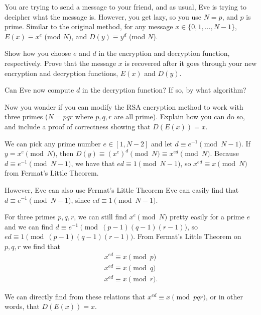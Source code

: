 \documentclass[11pt]{article}
\begin{document}
\newpage
{}
You are trying to send a message to your friend, and as usual, Eve is trying to decipher what the message is.
  However, you get lazy, so you use $N = p$, and $p$ is prime.
  Similar to the original method, for any message $x \in \{0,1, \ldots, N-1\}$, $E(x) \equiv x^e$ (mod $N$), and $D(y) \equiv y^d$ (mod $N$).
\begin{Parts}
  \Part
  Show how you choose $e$ and $d$ in the encryption and decryption function, respectively. Prove that the message $x$ is recovered after it goes through your new encryption and decryption functions, $E(x)$ and $D(y)$.

    \Part
    Can Eve now compute $d$ in the decryption function? If so, by what algorithm?

    \Part Now you wonder if you can modify the RSA encryption method to work with three primes ($N = pqr$ where $p, q, r$ are all prime). Explain how you can do so, and include a proof of correctness showing that $D(E(x)) = x$.

\end{Parts}

\begin{solution}
    \begin{Parts}
        \Part
        We can pick any prime number $e \in [1, N-2]$ and let $d \equiv e^{-1} \pmod{N-1}$. If $y = x^e \pmod N$, then $D(y) \equiv (x^e)^d \pmod N \equiv x^{ed} \pmod N$. Because $d \equiv e^{-1} \pmod{N-1}$, we have that $ed \equiv 1 \pmod{N-1}$, so $x^{ed} \equiv x \pmod N$ from Fermat's Little Theorem.
        
        \Part 
        However, Eve can also use Fermat's Little Theorem Eve can easily find that $d \equiv e^{-1} \pmod{N-1}$, since $ed \equiv 1 \pmod{N-1}$.
        
        \Part
        For three primes $p, q, r$, we can still find $x^e \pmod N$ pretty easily for a prime $e$ and we can find $d \equiv e^{-1} \pmod{(p-1)(q-1)(r-1)}$, so $ed \equiv 1 \pmod{(p-1)(q-1)(r-1)}$. From Fermat's Little Theorem on $p, q, r$ we find that
        \begin{align*}
            x^{ed} \equiv x \pmod{p} \\
            x^{ed} \equiv x \pmod{q} \\
            x^{ed} \equiv x \pmod{r}.
        \end{align*}
        
        We can directly find from these relations that $x^{ed} \equiv x \pmod{pqr}$, or in other words, that $D(E(x)) = x$.
    \end{Parts}
\end{solution}
\end{document}
